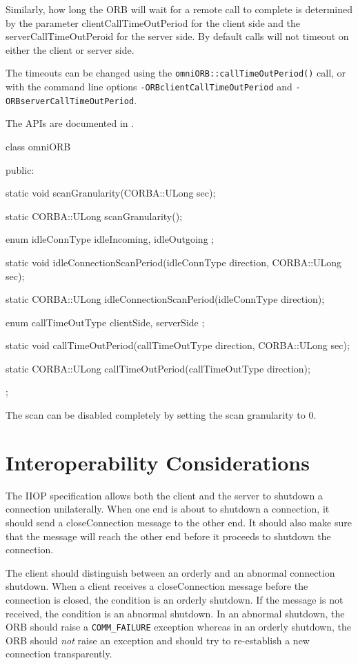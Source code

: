\documentclass[11pt,twoside,a4paper]{book}
\newcommand{\code}[1]{\texttt{#1}}
\newcommand{\op}[1]{\texttt{#1()}}
\newcommand{\file}{\begingroup \urlstyle{tt}\Url}
\begin{document}
Similarly, how long the ORB will wait for a remote call to complete is
determined by the parameter clientCallTimeOutPeriod for the client
side and the serverCallTimeOutPeroid for the server side. By default
calls will not timeout on either the client or server side.

The timeouts can be changed using the
\op{omniORB::callTimeOutPeriod} call, or with the command line
options \texttt{-ORBclientCallTimeOutPeriod} and
\texttt{-ORBserverCallTimeOutPeriod}.

The APIs are documented in \file{include/omniORB3/omniORB.h}.


\begin{cxxlisting}
class omniORB {
public:

  static void scanGranularity(CORBA::ULong sec);

  static CORBA::ULong scanGranularity();

  enum   idleConnType { idleIncoming, idleOutgoing };

  static void idleConnectionScanPeriod(idleConnType direction, CORBA::ULong sec);

  static CORBA::ULong idleConnectionScanPeriod(idleConnType direction);

  enum   callTimeOutType { clientSide, serverSide };

  static void callTimeOutPeriod(callTimeOutType direction, CORBA::ULong sec);

  static CORBA::ULong callTimeOutPeriod(callTimeOutType direction);
};
\end{cxxlisting}

The scan can be disabled completely by setting the scan granularity to
0.

\section{Interoperability Considerations}

The IIOP specification allows both the client and the server to
shutdown a connection unilaterally. When one end is about to shutdown
a connection, it should send a closeConnection message to the other
end. It should also make sure that the message will reach the other
end before it proceeds to shutdown the connection.

The client should distinguish between an orderly and an abnormal
connection shutdown. When a client receives a closeConnection message
before the connection is closed, the condition is an orderly shutdown.
If the message is not received, the condition is an abnormal shutdown.
In an abnormal shutdown, the ORB should raise a \code{COMM\_FAILURE}
exception whereas in an orderly shutdown, the ORB should \emph{not}
raise an exception and should try to re-establish a new connection
transparently.
\end{document}
